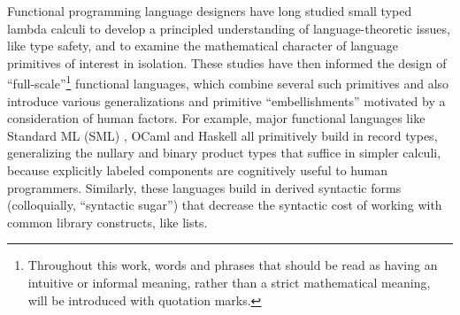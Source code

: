 Functional programming language designers have long studied small typed lambda calculi to develop a principled understanding of language-theoretic issues, like type safety, and to examine the mathematical character of language primitives of interest in isolation. These studies have then informed the design of ``full-scale''\footnote{Throughout this work, words and phrases that should be read as having an intuitive or informal meaning, rather than a strict mathematical meaning, will be introduced with quotation marks.} functional languages, which combine several such primitives and also introduce various generalizations and primitive ``embellishments''  motivated by a consideration of human factors. 
For example, major functional languages like Standard ML (SML) \cite{mthm97-for-dart,harper1997programming}, OCaml \cite{ocaml-manual} and Haskell \cite{jones2003haskell} all primitively build in record types, generalizing the nullary and binary product types that suffice in simpler calculi, because explicitly labeled components are cognitively useful to human programmers. Similarly, these languages build in derived syntactic forms (colloquially, ``syntactic sugar'') that decrease the syntactic cost of working with common library constructs, like lists.

